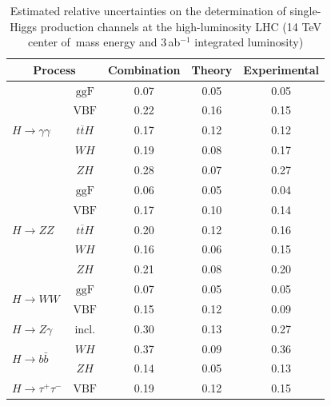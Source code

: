 \documentclass[../report.tex]{subfiles}
\begin{document}
\begin{table}
        \begin{center}
                \begin{tabular}{lc|ccc}
                        \multicolumn{2}{c|}{Process}     & Combination & Theory & Experimental \\ \hline \hline
                        \multirow{5}{*}{${H}\to \gamma \gamma$} &$\text{ggF}$  & 0.07 & 0.05 & 0.05 \\
                        &$\text{VBF}$ & 0.22 & 0.16 & 0.15  \\
                        &${t\overline tH}$& 0.17 & 0.12 & 0.12 \\
                        &${WH}$& 0.19 & 0.08 & 0.17 \\
                        &${ZH}$& 0.28 & 0.07 & 0.27 \\ \hline
                        \multirow{5}{*}{${H}\to {ZZ}$}                  &$\text{ggF}$& 0.06 & 0.05 & 0.04 \\
                        &$\text{VBF}$& 0.17 & 0.10 & 0.14 \\
                        &${t\overline tH}$& 0.20 & 0.12 & 0.16 \\
                        &${WH}$& 0.16 & 0.06 & 0.15 \\
                        &${ZH}$& 0.21 & 0.08 & 0.20 \\ \hline
                        \multirow{2}{*}{${H}\to {WW}$}          &$\text{ggF}$& 0.07 & 0.05 & 0.05 \\
                        &$\text{VBF}$& 0.15 & 0.12 & 0.09 \\\hline
                        ${H}\to {Z\gamma}$                                      &incl.           & 0.30 & 0.13 & 0.27           \\\hline
                        \multirow{2}{*}{${H}\to {b\bar b}$}             &${WH}$& 0.37 & 0.09 & 0.36 \\
                        &${ZH}$& 0.14 & 0.05 & 0.13 \\\hline
                        ${H}\to \tau^+ \tau^- $                                         &$\text{VBF}$ & 0.19 & 0.12 & 0.15
                \end{tabular}
                \caption{Estimated relative uncertainties on the determination of single-Higgs production channels at the high-luminosity LHC (14 TeV center of\
 mass energy and 3\,ab$^{-1}$ integrated luminosity) }\label{tab:one}
        \end{center}
\end{table}
\end{document}
